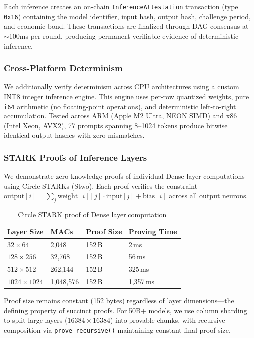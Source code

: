 \documentclass[conference]{IEEEtran}
\begin{document}
Each inference creates an on-chain \texttt{InferenceAttestation} transaction (type \texttt{0x16}) containing the model identifier, input hash, output hash, challenge period, and economic bond. These transactions are finalized through DAG consensus at $\sim$100ms per round, producing permanent verifiable evidence of deterministic inference.

\subsubsection{Cross-Platform Determinism}

We additionally verify determinism across CPU architectures using a custom INT8 integer inference engine. This engine uses per-row quantized weights, pure \texttt{i64} arithmetic (no floating-point operations), and deterministic left-to-right accumulation. Tested across ARM (Apple M2 Ultra, NEON SIMD) and x86 (Intel Xeon, AVX2), 77 prompts spanning 8--1024 tokens produce bitwise identical output hashes with zero mismatches.

\subsubsection{STARK Proofs of Inference Layers}

We demonstrate zero-knowledge proofs of individual Dense layer computations using Circle STARKs (Stwo). Each proof verifies the constraint $\text{output}[i] = \sum_j \text{weight}[i][j] \cdot \text{input}[j] + \text{bias}[i]$ across all output neurons.

\begin{table}[h]
\caption{Circle STARK proof of Dense layer computation}
\label{tab:starkdense}
\centering
\begin{tabular}{llll}
\toprule
Layer Size & MACs & Proof Size & Proving Time \\
\midrule
$32 \times 64$ & 2,048 & 152\,B & 2\,ms \\
$128 \times 256$ & 32,768 & 152\,B & 56\,ms \\
$512 \times 512$ & 262,144 & 152\,B & 325\,ms \\
$1024 \times 1024$ & 1,048,576 & 152\,B & 1,357\,ms \\
\bottomrule
\end{tabular}
\end{table}

Proof size remains constant (152 bytes) regardless of layer dimensions---the defining property of succinct proofs. For 50B+ models, we use column sharding to split large layers ($16384 \times 16384$) into provable chunks, with recursive composition via \texttt{prove\_recursive()} maintaining constant final proof size.
\end{document}
